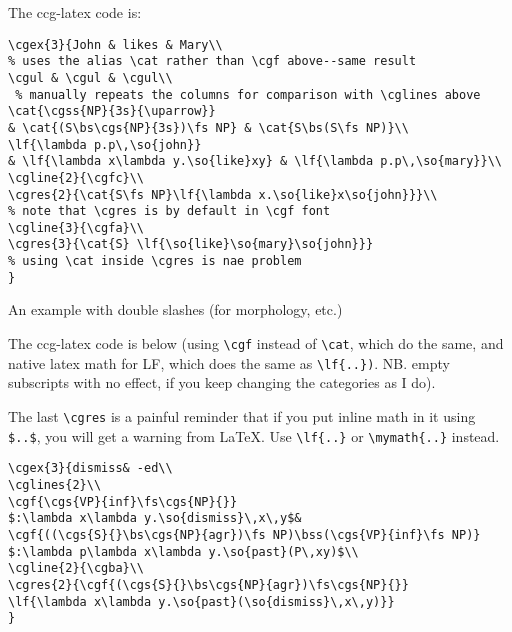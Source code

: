 \documentclass[11pt]{article}
\begin{document}
The ccg-latex code is:

\begin{verbatim}
\cgex{3}{John & likes & Mary\\ 
% uses the alias \cat rather than \cgf above--same result
\cgul & \cgul & \cgul\\ 
 % manually repeats the columns for comparison with \cglines above 
\cat{\cgss{NP}{3s}{\uparrow}} 
& \cat{(S\bs\cgs{NP}{3s})\fs NP} & \cat{S\bs(S\fs NP)}\\
\lf{\lambda p.p\,\so{john}} 
& \lf{\lambda x\lambda y.\so{like}xy} & \lf{\lambda p.p\,\so{mary}}\\
\cgline{2}{\cgfc}\\
\cgres{2}{\cat{S\fs NP}\lf{\lambda x.\so{like}x\so{john}}}\\  
% note that \cgres is by default in \cgf font
\cgline{3}{\cgfa}\\
\cgres{3}{\cat{S} \lf{\so{like}\so{mary}\so{john}}} 
% using \cat inside \cgres is nae problem
}
\end{verbatim}
\newpage

An example with double slashes (for morphology, etc.)\bigskip

\bigskip

The ccg-latex code is below (using \verb|\cgf| instead of \verb|\cat|, which do the same, and native latex math for LF, which does the  same as \verb|\lf{..})|. NB. empty subscripts with no effect, if you keep changing the categories as I do).

The last \verb|\cgres| is a painful reminder that if you put inline math
in it using \verb|$..$|, you will get a warning from \LaTeX. Use \verb|\lf{..}| or \verb|\mymath{..}|  instead.\medskip

\begin{verbatim}
\cgex{3}{dismiss& -ed\\
\cglines{2}\\
\cgf{\cgs{VP}{inf}\fs\cgs{NP}{}}
$:\lambda x\lambda y.\so{dismiss}\,x\,y$&
\cgf{((\cgs{S}{}\bs\cgs{NP}{agr})\fs NP)\bss(\cgs{VP}{inf}\fs NP)}
$:\lambda p\lambda x\lambda y.\so{past}(P\,xy)$\\
\cgline{2}{\cgba}\\
\cgres{2}{\cgf{(\cgs{S}{}\bs\cgs{NP}{agr})\fs\cgs{NP}{}}
\lf{\lambda x\lambda y.\so{past}(\so{dismiss}\,x\,y)}}
}
\end{verbatim}
\newpage
\end{document}
